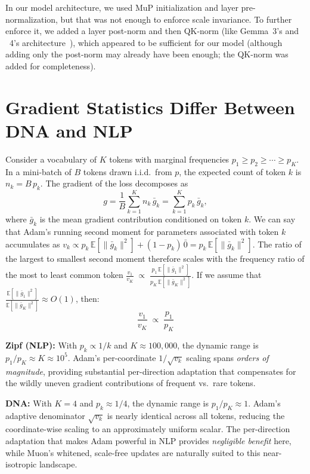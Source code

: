 \documentclass{article}
\begin{document}
In our model architecture, we used MuP initialization and layer pre-normalization, but that was not enough to enforce scale invariance. To further enforce it, we added a layer post-norm and then QK-norm (like Gemma~3's and ~4's architecture~\citep{gemma}), which appeared to be sufficient for our model (although adding only the post-norm may already have been enough; the QK-norm was added for completeness).


\section{Gradient Statistics Differ Between DNA and NLP}
\label{app:gradient-stats}

Consider a vocabulary of $K$ tokens with marginal frequencies $p_1\ge p_2\ge\cdots\ge p_K$. In a mini-batch of $B$ tokens drawn i.i.d.\ from $p$, the expected count of token $k$ is $n_k=B\,p_k$. The gradient of the loss decomposes as
\[
g = \frac{1}{B}\sum_{k=1}^{K} n_k\,\bar g_k
  = \sum_{k=1}^{K} p_k\,\bar g_k,
\]
where $\bar g_k$ is the mean gradient contribution conditioned on token $k$. We can say that Adam's running second moment for parameters associated with token $k$ accumulates as $v_k\propto p_k\,\mathbb{E}[\|\bar g_k\|^2]+(1-p_k)\,\bar 0=p_k\,\mathbb{E}[\|\bar g_k\|^2]$. The ratio of the largest to smallest second moment therefore scales with the frequency ratio of the most to least common token
$\frac{v_1}{v_K}\;\propto\;\frac{p_1\,\mathbb{E}[\|\bar g_1\|^2]}{p_K\,\mathbb{E}[\|\bar g_K\|^2]}$.
If we assume that $\frac{\mathbb{E}[\|\bar g_1\|^2]}{\mathbb{E}[\|\bar g_K\|^2]}\approx O(1)$, then:
\[
\frac{v_1}{v_K}\;\propto\;\frac{p_1}{p_K}
\]

\textbf{Zipf (NLP):} With $p_k\propto 1/k$ and $K\approx 100{,}000$, the dynamic range is $p_1/p_K\approx K\approx 10^5$. Adam's per-coordinate $1/\sqrt{v_k}$ scaling spans \emph{orders of magnitude}, providing substantial per-direction adaptation that compensates for the wildly uneven gradient contributions of frequent vs.\ rare tokens.

\textbf{DNA:} With $K=4$ and $p_k\approx 1/4$, the dynamic range is $p_1/p_K\approx 1$. Adam's adaptive denominator $\sqrt{v_k}$ is nearly identical across all tokens, reducing the coordinate-wise scaling to an approximately uniform scalar. The per-direction adaptation that makes Adam powerful in NLP provides \emph{negligible benefit} here, while Muon's whitened, scale-free updates are naturally suited to this near-isotropic landscape.
\end{document}

